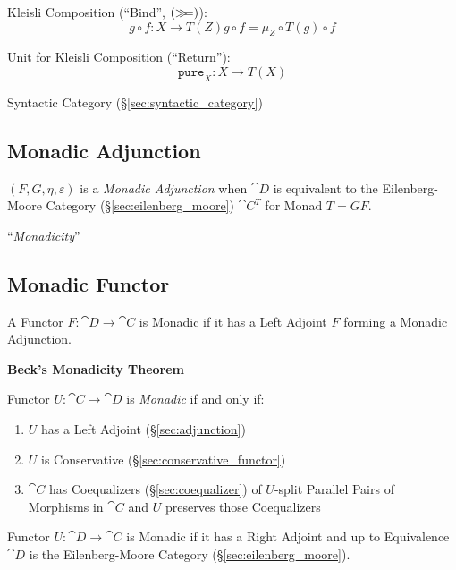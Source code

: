 Kleisli Composition (``Bind'', $\mathtt{(\mathsf{\gg\kern-3pt=})}$):
\[
  g \circ f : X \rightarrow T(Z)
  g \circ f = \mu_Z \circ T(g) \circ f
\]

Unit for Kleisli Composition (``Return''):
\[
  \mathtt{pure}_X : X \rightarrow T (X)
\]

Syntactic Category (\S\ref{sec:syntactic_category})



\subsection{Monadic Adjunction}\label{sec:monadic_adjunction}

$(F,G,\eta,\varepsilon)$ is a \emph{Monadic Adjunction} when
$\cat{D}$ is equivalent to the Eilenberg-Moore Category
(\S\ref{sec:eilenberg_moore}) $\cat{C}^T$ for Monad $T = GF$.

``\emph{Monadicity}''



\subsection{Monadic Functor}\label{sec:monadic_functor}

A Functor $F : \cat{D} \rightarrow \cat{C}$ is Monadic if it has
a Left Adjoint $F$ forming a Monadic Adjunction.

\textbf{Beck's Monadicity Theorem}

Functor $U : \cat{C} \rightarrow \cat{D}$ is \emph{Monadic} if
and only if:
\begin{enumerate}
  \item $U$ has a Left Adjoint (\S\ref{sec:adjunction})
  \item $U$ is Conservative (\S\ref{sec:conservative_functor})
  \item $\cat{C}$ has Coequalizers (\S\ref{sec:coequalizer}) of
    $U$-split Parallel Pairs of Morphisms in $\cat{C}$ and $U$
    preserves those Coequalizers
\end{enumerate}

Functor $U : \cat{D} \rightarrow \cat{C}$ is Monadic if it has a
Right Adjoint and up to Equivalence $\cat{D}$ is the
Eilenberg-Moore Category (\S\ref{sec:eilenberg_moore}).
\cite{lambek-scott88}

